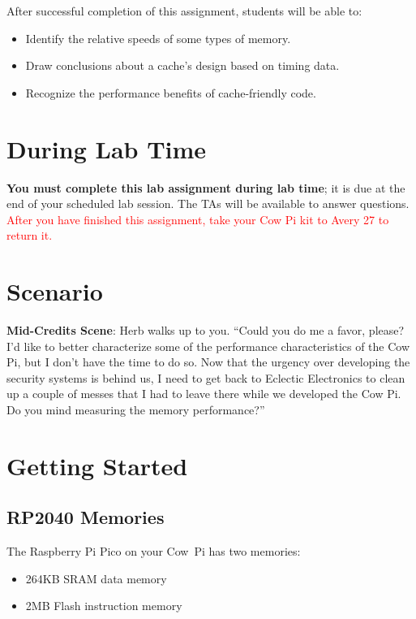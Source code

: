 After successful completion of this assignment, students will be able to:
\begin{itemize}
\item Identify the relative speeds of some types of memory.
\item Draw conclusions about a cache's design based on timing data.
\item Recognize the performance benefits of cache-friendly code.
\end{itemize}


\section*{During Lab Time}

\textbf{You must complete this lab assignment during lab time}; it is due at the
end of your scheduled lab session. The TAs will be available to answer
questions. \textcolor{red}{After you have finished this assignment, take your Cow Pi kit to Avery 27 to return it.}

\section{Scenario}

{\large \textbf{Mid-Credits Scene}:} Herb walks up to you. ``Could you do me a
favor, please? I'd like to better characterize some of the performance
characteristics of the Cow Pi, but I don't have the time to do so. Now that the
urgency over developing the security systems is behind us, I need to get back to
Eclectic Electronics to clean up a couple of messes that I had to leave there
while we developed the Cow Pi. Do you mind measuring the memory performance?''


\section{Getting Started}

\subsection{RP2040 Memories}

The Raspberry Pi Pico on your Cow~Pi has two memories:

\begin{itemize}
    \item 264KB SRAM data memory
    \item 2MB Flash instruction memory
\end{itemize}

